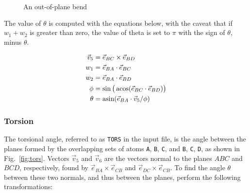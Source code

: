 \documentclass{article}
\begin{document}
\begin{figure}[ht]
  \centering
  \caption{An out-of-plane bend}
  \label{fig:out}

\end{figure}

The value of $\theta$ is computed with the equations below, with the caveat that
if $w_1 + w_2$ is greater than zero, the value of theta is set to $\pi$ with the
sign of $\theta$, minus $\theta$.

\begin{align}
  \vec{v}_5 &= \vec{e}_{BC} \times \vec{e}_{BD} \\
  w_1 &= \vec{e}_{BA} \cdot \vec{e}_{BC} \\
  w_2 &= \vec{e}_{BA} \cdot \vec{e}_{BD} \\
  \phi &= \sin \big( \acos (\vec{e}_{BC} \cdot \vec{e}_{BD}) \big) \\
  \theta &= \asin ( \vec{e}_{BA} \cdot \vec{v}_5 / \phi)
\end{align}

\subsubsection{Torsion}
\label{sec:tors}

The torsional angle, referred to as \verb|TORS| in the input file, is the angle
between the planes formed by the overlapping sets of atoms \verb|A|, \verb|B|,
\verb|C|, and \verb|B|, \verb|C|, \verb|D|, as shown in Fig.~\ref{fig:tors}.
Vectors $\vec{v}_5$ and $\vec{v}_6$ are the vectors normal to the planes $ABC$
and $BCD$, respectively, found by $\vec{e}_{BA} \times \vec{e}_{CB}$ and
$\vec{e}_{DC} \times \vec{e}_{CB}$. To find the angle $\theta$ between these two
normals, and thus between the planes, perform the following transformations:
\end{document}

